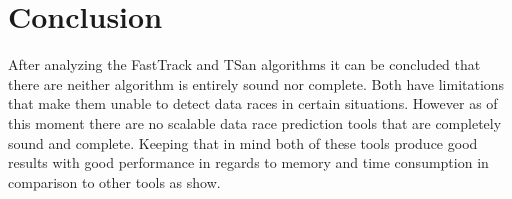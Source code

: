\documentclass[12pt]{article}
\begin{document}
	\section{Conclusion}
	After analyzing the FastTrack and TSan algorithms it can be concluded that there are neither algorithm is entirely sound nor complete. Both have limitations that make them unable to detect data races in certain situations. However as of this moment there are no scalable data race prediction tools that are completely sound and complete. Keeping that in mind both of these tools produce good results with good performance in regards to memory and time consumption in comparison to other tools as \cite{flanagan}\cite{wilcox} show.
	\newpage                                          
	\printbibliography[heading= bibintoc, title={List of Literature}]
	\newpage
	{\hypersetup{linkcolor=black}
		\listoffigures
		\newpage
		\listoftables
		\newpage
		\lstlistoflistings
	}
\end{document}
